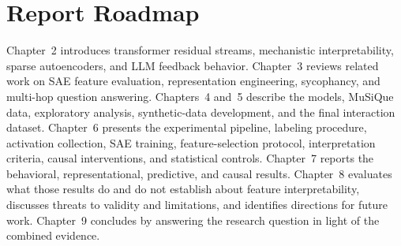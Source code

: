 \section{Report Roadmap}

Chapter~2 introduces transformer residual streams, mechanistic
interpretability, sparse autoencoders, and LLM feedback behavior. Chapter~3
reviews related work on SAE feature evaluation, representation engineering,
sycophancy, and multi-hop question answering. Chapters~4 and~5 describe the
models, MuSiQue data, exploratory analysis, synthetic-data development, and
the final interaction dataset. Chapter~6 presents the experimental pipeline,
labeling procedure, activation collection, SAE training, feature-selection
protocol, interpretation criteria, causal interventions, and statistical
controls. Chapter~7 reports the behavioral, representational, predictive, and
causal results. Chapter~8 evaluates what those results do and do not establish
about feature interpretability, discusses threats to validity and limitations,
and identifies directions for future work. Chapter~9 concludes by answering
the research question in light of the combined evidence.
